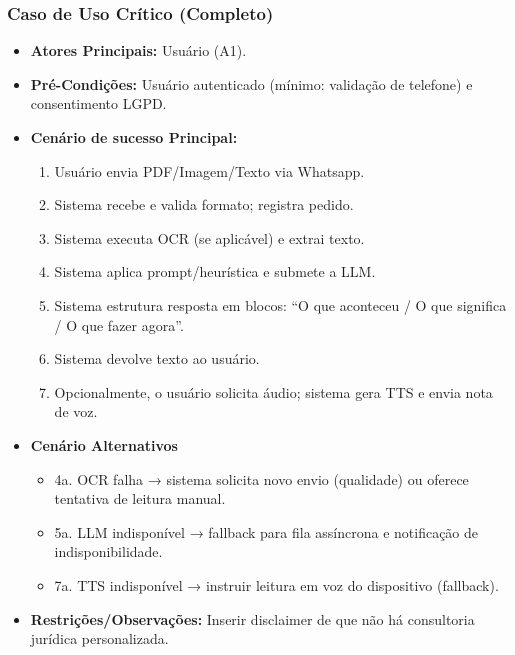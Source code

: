 \documentclass{article}
\begin{document}
\subsubsection{Caso de Uso Crítico (Completo)}
\begin{itemize}
    \item \textbf{Atores Principais: }Usuário (A1).
    \item \textbf{Pré-Condições: }Usuário autenticado (mínimo: validação de telefone) e consentimento LGPD.
    \item \textbf{Cenário de sucesso Principal:}
    \begin{enumerate}
        \item Usuário envia PDF/Imagem/Texto via Whatsapp.
        \item Sistema recebe e valida formato; registra pedido.
        \item Sistema executa OCR (se aplicável) e extrai texto.
        \item Sistema aplica prompt/heurística e submete a LLM.
        \item Sistema estrutura resposta em blocos: “O que aconteceu / O que significa / O que fazer agora”.
        \item Sistema devolve texto ao usuário.
        \item Opcionalmente, o usuário solicita áudio; sistema gera TTS e envia nota de voz.
    \end{enumerate}

    \item \textbf{Cenário Alternativos}
    \begin{itemize}
        \item 4a. OCR falha → sistema solicita novo envio (qualidade) ou oferece tentativa de leitura manual.
        \item 5a. LLM indisponível → fallback para fila assíncrona e notificação de indisponibilidade.
        \item 7a. TTS indisponível → instruir leitura em voz do dispositivo (fallback).
    \end{itemize}
    \item \textbf{Restrições/Observações:} Inserir disclaimer de que não há consultoria jurídica personalizada.
\end{itemize}
\end{document}
